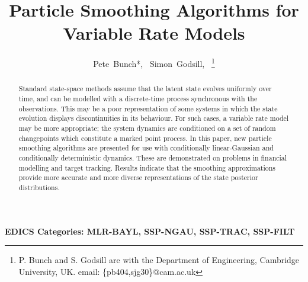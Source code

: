 \documentclass[peerreview,11pt,draftcls,onecolumn]{IEEEtran}
\begin{document}
\title{Particle Smoothing Algorithms for Variable Rate Models}

\author{Pete~Bunch*,~
        Simon~Godsill,~%
\thanks{P. Bunch and S. Godsill are with the Department
of Engineering, Cambridge University, UK. email: \{pb404,sjg30\}@cam.ac.uk}%
}


\maketitle

\begin{abstract}
Standard state-space methods assume that the latent state evolves uniformly over time, and can be modelled with a discrete-time process synchronous with the observations. This may be a poor representation of some systems in which the state evolution displays discontinuities in its behaviour. For such cases, a variable rate model may be more appropriate; the system dynamics are conditioned on a set of random changepoints which constitute a marked point process. In this paper, new particle smoothing algorithms are presented for use with conditionally linear-Gaussian and conditionally deterministic dynamics. These are demonstrated on problems in financial modelling and target tracking. Results indicate that the smoothing approximations provide more accurate and more diverse representations of the state posterior distributions.
\end{abstract}


\ifCLASSOPTIONpeerreview
\begin{center} \bfseries EDICS Categories: MLR-BAYL, SSP-NGAU, SSP-TRAC, SSP-FILT \end{center}
\fi

\newpage
\end{document}
